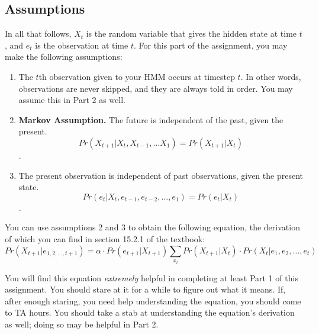 \documentclass{article}
\begin{document}
    \subsection{Assumptions}
    In all that follows, $X_t$ is the random variable that gives the hidden state at time $t$, and $e_t$ is the observation at time $t$.
    For this part of the assignment, you may make the following assumptions:
    \begin{enumerate}
        \item The $t$th observation given to your HMM occurs at timestep $t$. In other words, observations are never skipped, and they are always told in order. You may assume this in Part 2 as well.

        \item \textbf{Markov Assumption.} The future is independent of the past, given the present. $$Pr(X_{t + 1} | X_t, X_{t - 1}, \ldots X_1) = Pr(X_{t + 1} | X_t)$$.

        \item The present observation is independent of past observations, given the present state.
        $$Pr(e_{t} | X_{t}, e_{t - 1}, e_{t - 2}, ..., e_1) = Pr(e_{t} | X_{t})$$.
    \end{enumerate}

    You can use assumptions 2 and 3 to obtain the following equation, the derivation of which you can find in section 15.2.1 of the textbook:
    \begin{equation}
        Pr(X_{t + 1} | e_{1, 2, \ldots, t + 1}) = \alpha \cdot Pr(e_{t + 1} | X_{t + 1}) \sum_{x_t} Pr(X_{t + 1} | X_t) \cdot Pr(X_t | e_1, e_2, \ldots, e_t)
    \end{equation}

    You will find this equation \textit{extremely} helpful in completing at least Part 1 of this assignment.
    You should stare at it for a while to figure out what it means.
    If, after enough staring, you need help understanding the equation, you should come to TA hours.
    You should take a stab at understanding the equation's derivation as well; doing so may be helpful in Part 2.
    ~\\
\end{document}
